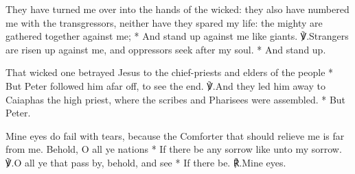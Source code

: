 \documentclass[12pt]{book}
\begin{document}





\silently


\begin{enpars}
They have turned me over into the hands of the wicked: they also have numbered me with the transgressors, neither have they spared my life: the mighty are gathered together against me;
* And stand up against me like giants.
℣.\@  Strangers are risen up against me, and oppressors seek after my soul.
* And stand up.
\end{enpars}


\begin{enpars}
That wicked one betrayed Jesus to the chief-priests and elders of the people
* But Peter followed him afar off, to see the end.
℣.\@  And they led him away to Caiaphas the high priest, where the scribes and Pharisees were assembled.
* But Peter.
\end{enpars}


\begin{enpars}
Mine eyes do fail with tears, because the Comforter that should relieve me is far from me. Behold, O all ye nations
* If there be any sorrow like unto my sorrow.
℣.\@  O all ye that pass by, behold, and see
* If there be.
℟.\@ Mine eyes.
\end{enpars}
\end{document}
